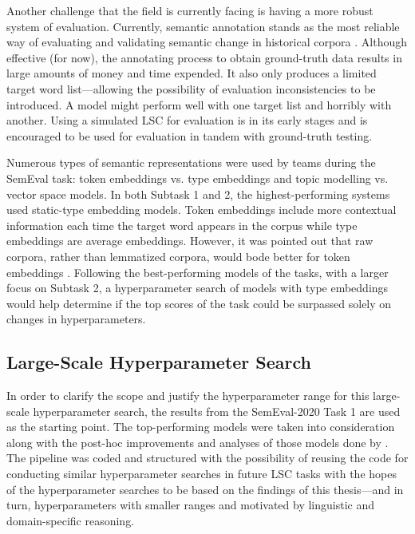 
Another challenge that the field is currently facing is having a more robust system of evaluation. Currently, semantic annotation stands as the most reliable way of evaluating and validating semantic change in historical corpora \citep{hengchen2021challenges}. Although effective (for now), the annotating process to obtain ground-truth data results in large amounts of money and time expended. It also only produces a limited target word list—allowing the possibility of evaluation inconsistencies to be introduced. A model might perform well with one target list and horribly with another. Using a simulated LSC for evaluation is in its early stages and is encouraged to be used for evaluation in tandem with ground-truth testing.

Numerous types of semantic representations were used by teams during the SemEval task: token embeddings vs. type embeddings and topic modelling vs. vector space models. In both Subtask 1 and 2, the highest-performing systems used static-type embedding models. Token embeddings include more contextual information each time the target word appears in the corpus while type embeddings are average embeddings. However, it was pointed out that raw corpora, rather than lemmatized corpora, would bode better for token embeddings \citep{schlechtweg-etal-2020-semeval}. Following the best-performing models of the tasks, with a larger focus on Subtask 2, a hyperparameter search of models with type embeddings would help determine if the top scores of the task could be surpassed solely on changes in hyperparameters. 


\subsection{Large-Scale Hyperparameter Search}

In order to clarify the scope and justify the hyperparameter range for this large-scale hyperparameter search, the results from the SemEval-2020 Task 1 are used as the starting point. The top-performing models were taken into consideration along with the post-hoc improvements and analyses of those models done by \citet{kaiser-etal-2020-ims}. The pipeline was coded and structured with the possibility of reusing the code for conducting similar hyperparameter searches in future LSC tasks with the hopes of the hyperparameter searches to be based on the findings of this thesis—and in turn, hyperparameters with smaller ranges and motivated by linguistic and domain-specific reasoning. 

